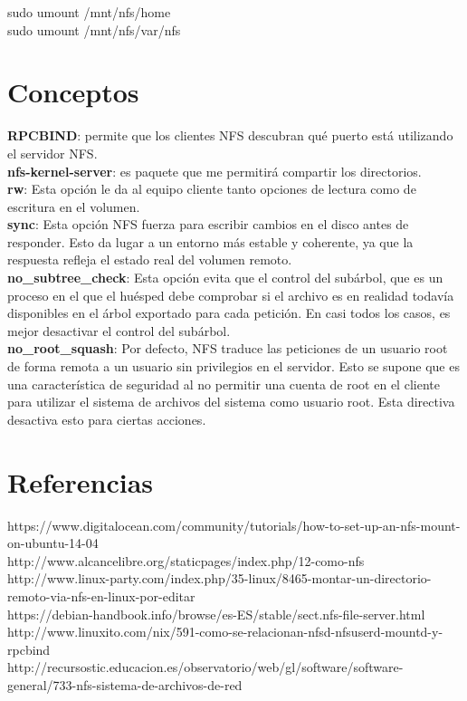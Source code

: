 \documentclass[12pt]{article}
\begin{document}
   sudo umount /mnt/nfs/home\\
   sudo umount /mnt/nfs/var/nfs\\

\section{Conceptos}
        \textbf{RPCBIND}: permite que los clientes NFS descubran qué 
        puerto está utilizando el servidor NFS.\\ 
        \textbf{nfs-kernel-server}: es paquete que me permitirá 
        compartir los directorios. \\
        \textbf{rw}: Esta opción le da al equipo cliente tanto 
        opciones de lectura como de escritura en el volumen. \\
        \textbf{sync}: Esta opción NFS fuerza para escribir cambios
        en el disco antes de responder. Esto da lugar a un entorno más 
        estable y coherente, ya que la respuesta refleja el estado real del
        volumen remoto.\\
        \textbf{no\_subtree\_check}: Esta opción evita que el control 
        del subárbol, que es un proceso en el que el huésped debe comprobar
        si el archivo es en realidad todavía disponibles en el árbol 
        exportado para cada petición. En casi todos los casos, es mejor 
        desactivar el control del subárbol.\\
        \textbf{no\_root\_squash}: Por defecto, NFS traduce las 
       peticiones de un usuario root de forma remota a un usuario sin 
       privilegios en el servidor. Esto se supone que es una característica
       de seguridad al no permitir una cuenta de root en el cliente para 
       utilizar el sistema de archivos del sistema como usuario root. Esta 
       directiva desactiva esto para ciertas acciones.\\

\section{Referencias}
    https://www.digitalocean.com/community/tutorials/how-to-set-up-an-nfs-mount-on-ubuntu-14-04\\
    http://www.alcancelibre.org/staticpages/index.php/12-como-nfs\\
    http://www.linux-party.com/index.php/35-linux/8465-montar-un-directorio-remoto-via-nfs-en-linux-por-editar\\
    https://debian-handbook.info/browse/es-ES/stable/sect.nfs-file-server.html\\
    http://www.linuxito.com/nix/591-como-se-relacionan-nfsd-nfsuserd-mountd-y-rpcbind\\
    http://recursostic.educacion.es/observatorio/web/gl/software/software-general/733-nfs-sistema-de-archivos-de-red\\
\end{document}
